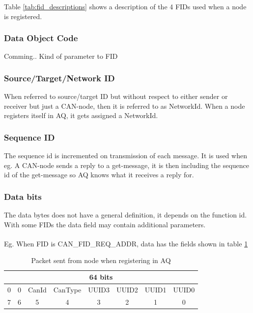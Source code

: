 Table \ref{tab:fid_descriptions} shows a description of the 4 FIDs used when a node is registered. 

\subsubsection{Data Object Code}
Comming.. Kind of parameter to FID

\subsubsection{Source/Target/Network ID}
When referred to source/target ID but without respect to either sender or receiver but just a CAN-node, then it is referred to as NetworkId. When a node registers itself in AQ, it gets assigned a NetworkId.

\subsubsection{Sequence ID}
The sequence id is incremented on transmission of each message. It is used when eg. 
A CAN-node sends a reply to a get-message, it is then including the sequence id of the get-message so AQ knows what it receives a reply for.

\subsubsection{Data bits}
The data bytes does not have a general definition, it depends on the function id. With some FIDs the data field may contain additional parameters.\\ \\
Eg. When FID is CAN\_FID\_REQ\_ADDR, data has the fields shown in table \ref{tab:packet_from_node}
\begin{table}[H]
\centering
\caption{Packet sent from node when registering in AQ}
\label{tab:packet_from_node}
\begin{tabular}{@{}|c|c|c|c|c|c|c|c|@{}}
\toprule
\multicolumn{8}{|c|}{64 bits}                           \\ \midrule
0 & 0 & CanId & CanType & UUID3 & UUID2 & UUID1 & UUID0 \\
\midrule
7 & 6 & 5 & 4 & 3 & 2 & 1 & 0 \\ \bottomrule
\end{tabular}
\end{table}

